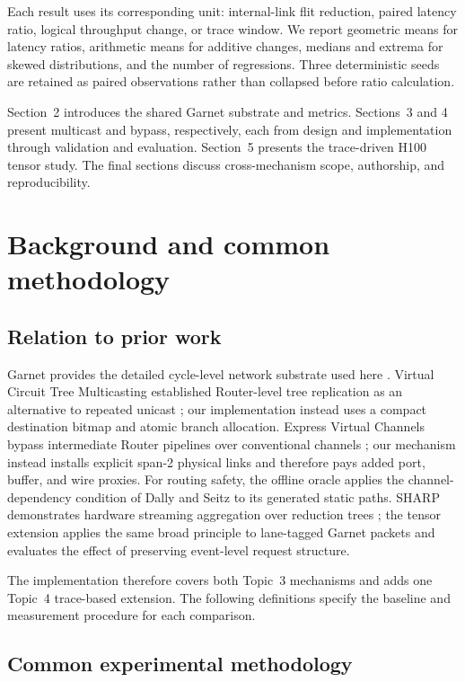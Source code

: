 \documentclass[10pt]{article}
\begin{document}
Each result uses its corresponding unit: internal-link flit reduction, paired latency
ratio, logical throughput change, or trace window.  We report geometric means
for latency ratios, arithmetic means for additive changes, medians and extrema
for skewed distributions, and the number of regressions.  Three deterministic
seeds are retained as paired observations rather than collapsed before ratio
calculation.

Section~2 introduces the shared Garnet substrate and metrics.  Sections~3 and
4 present multicast and bypass, respectively, each from design and
implementation through validation and evaluation.  Section~5 presents the
trace-driven H100 tensor study.  The final sections discuss cross-mechanism
scope, authorship, and reproducibility.

\section{Background and common methodology}

\subsection{Relation to prior work}

Garnet provides the detailed cycle-level network substrate used here
\cite{garnet}.  Virtual Circuit Tree Multicasting established Router-level
tree replication as an alternative to repeated unicast \cite{vctm}; our
implementation instead uses a compact destination bitmap and atomic branch
allocation.  Express Virtual Channels bypass intermediate
Router pipelines over conventional channels \cite{evc}; our mechanism instead
installs explicit span-2 physical links and therefore pays added port, buffer,
and wire proxies.  For routing safety, the offline oracle applies the
channel-dependency condition of Dally and Seitz \cite{dally-deadlock} to its
generated static paths.  SHARP demonstrates hardware streaming aggregation
over reduction trees \cite{sharp-streaming}; the tensor extension applies the
same broad principle to lane-tagged Garnet packets and evaluates the effect of
preserving event-level request structure.

The implementation therefore covers both Topic~3 mechanisms and adds one
Topic~4 trace-based extension.  The following definitions specify the
baseline and measurement procedure for each comparison.

\subsection{Common experimental methodology}
\end{document}
